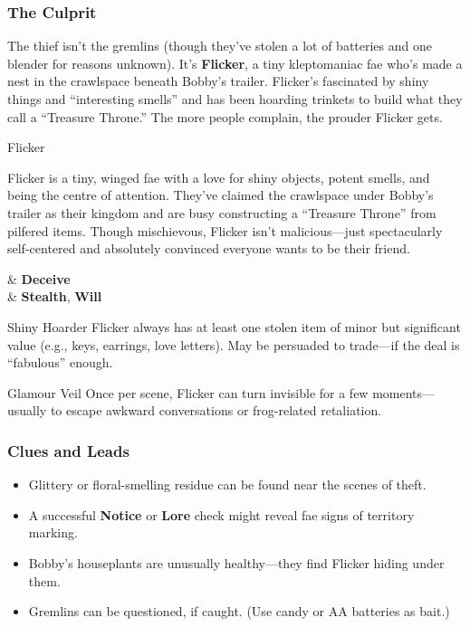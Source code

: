 \subsubsection{The Culprit}
The thief isn’t the gremlins (though they’ve stolen a lot of batteries and one blender for reasons unknown). It’s \textbf{Flicker}, a tiny kleptomaniac fae who’s made a nest in the crawlspace beneath Bobby’s trailer. Flicker’s fascinated by shiny things and “interesting smells” and has been hoarding trinkets to build what they call a “Treasure Throne.” The more people complain, the prouder Flicker gets.

\begin{NPC}[description={Fae, Kleptomaniac, Glitter-Obsessed}]{Flicker}

    Flicker is a tiny, winged fae with a love for shiny objects, potent smells, and being the centre of attention. They’ve claimed the crawlspace under Bobby’s trailer as their kingdom and are busy constructing a “Treasure Throne” from pilfered items. Though mischievous, Flicker isn’t malicious—just spectacularly self-centered and absolutely convinced everyone wants to be their friend.

    \vspace{0.5\baselineskip}
    \begin{SkillsBox}
        \Skilled & \textbf{Deceive} \\
        \Novice  & \textbf{Stealth}, \textbf{Will}
    \end{SkillsBox}

    \begin{TraitsBox}
        \item[Shiny Hoarder] Flicker always has at least one stolen item of minor but significant value (e.g., keys, earrings, love letters). May be persuaded to trade—if the deal is “fabulous” enough.
        \item[Glamour Veil] Once per scene, Flicker can turn invisible for a few moments—usually to escape awkward conversations or frog-related retaliation.
    \end{TraitsBox}

    \DamageBox[%
        totalfatigue=3,%
        totalmild=2,totalmoderate=0,totalsevere=0,%
    ]
\end{NPC}

\subsubsection{Clues and Leads}
\begin{itemize}\raggedright
    \item Glittery or floral-smelling residue can be found near the scenes of theft.
    \item A successful \textbf{Notice}  or \textbf{Lore}  check might reveal fae signs of territory marking.
    \item Bobby’s houseplants are unusually healthy—they find Flicker hiding under them.
    \item Gremlins can be questioned, if caught. (Use candy or AA batteries as bait.)
\end{itemize}

